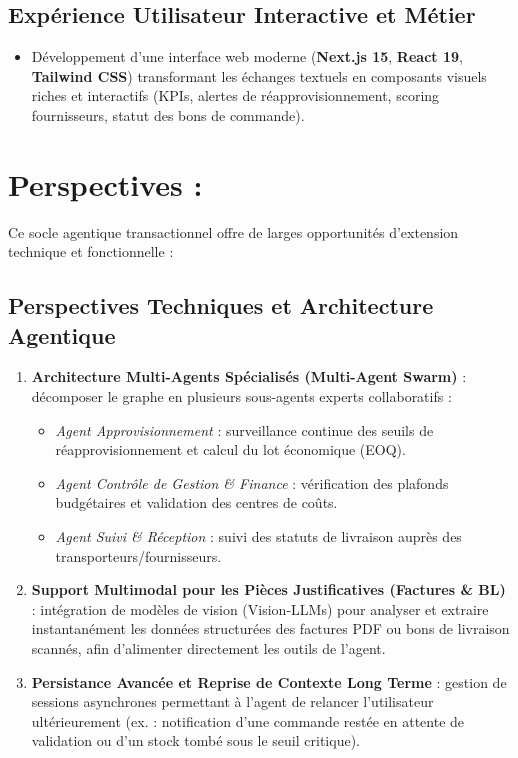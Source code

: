 \subsection{Expérience Utilisateur Interactive et Métier}
 
\begin{itemize}
    \item Développement d'une interface web moderne (\textbf{Next.js 15}, \textbf{React 19}, \textbf{Tailwind CSS}) transformant les échanges textuels en composants visuels riches et interactifs (KPIs, alertes de réapprovisionnement, scoring fournisseurs, statut des bons de commande).
\end{itemize}
 
\section{Perspectives :}

Ce socle agentique transactionnel offre de larges opportunités d'extension technique et fonctionnelle :
 
\subsection{Perspectives Techniques et Architecture Agentique}
 
\begin{enumerate}
    \item \textbf{Architecture Multi-Agents Spécialisés (Multi-Agent Swarm)} : décomposer le graphe en plusieurs sous-agents experts collaboratifs :
    \begin{itemize}
        \item \textit{Agent Approvisionnement} : surveillance continue des seuils de réapprovisionnement et calcul du lot économique (EOQ).
        \item \textit{Agent Contrôle de Gestion \& Finance} : vérification des plafonds budgétaires et validation des centres de coûts.
        \item \textit{Agent Suivi \& Réception} : suivi des statuts de livraison auprès des transporteurs/fournisseurs.
    \end{itemize}
    \item \textbf{Support Multimodal pour les Pièces Justificatives (Factures \& BL)} : intégration de modèles de vision (Vision-LLMs) pour analyser et extraire instantanément les données structurées des factures PDF ou bons de livraison scannés, afin d'alimenter directement les outils de l'agent.
    \item \textbf{Persistance Avancée et Reprise de Contexte Long Terme} : gestion de sessions asynchrones permettant à l'agent de relancer l'utilisateur ultérieurement (ex. : notification d'une commande restée en attente de validation ou d'un stock tombé sous le seuil critique).
\end{enumerate}
 
